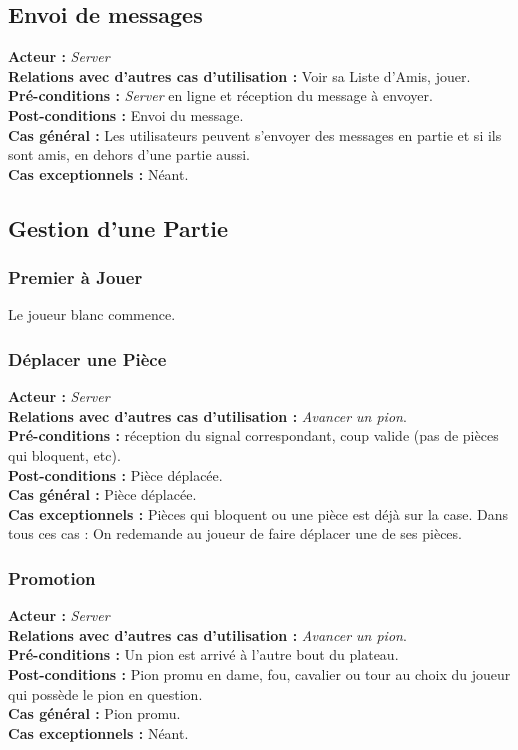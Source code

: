 \documentclass[10pt, a4paper]{article}
\begin{document}
\subsection{Envoi de messages}
\textbf{Acteur :} \textit{Server} \\
\textbf{Relations avec d'autres cas d'utilisation :} Voir sa Liste d'Amis, jouer. \\
\textbf{Pré-conditions :} \textit{Server} en ligne et réception du message à envoyer. \\
\textbf{Post-conditions :} Envoi du message. \\
\textbf{Cas général :} Les utilisateurs peuvent s'envoyer des messages en partie et si ils sont amis, en dehors d'une partie aussi. \\
\textbf{Cas exceptionnels :} Néant. \\

\subsection{Gestion d'une Partie}

\subsubsection{Premier à Jouer}
Le joueur blanc commence.

\subsubsection{Déplacer une Pièce}
\textbf{Acteur :} \textit{Server} \\
\textbf{Relations avec d'autres cas d'utilisation :} {\itshape Avancer un pion}. \\
\textbf{Pré-conditions :} réception du signal correspondant, coup valide (pas de pièces qui bloquent, etc). \\
\textbf{Post-conditions :} Pièce déplacée. \\
\textbf{Cas général :} Pièce déplacée. \\
\textbf{Cas exceptionnels :} Pièces qui bloquent ou une pièce est déjà sur la case. Dans tous ces cas : On redemande au joueur de faire déplacer une de ses pièces. \\

\subsubsection{Promotion}
\textbf{Acteur :} \textit{Server} \\
\textbf{Relations avec d'autres cas d'utilisation :} {\itshape Avancer un pion}. \\
\textbf{Pré-conditions :} Un pion est arrivé à l'autre bout du plateau. \\
\textbf{Post-conditions :} Pion promu en dame, fou, cavalier ou tour au choix du joueur qui possède le pion en question. \\
\textbf{Cas général :} Pion promu. \\
\textbf{Cas exceptionnels :} Néant. \\
\end{document}
